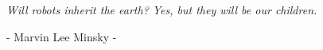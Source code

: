 \documentclass[twoside,b5paper,12pt,openright]{book}
\newcommand{\clearemptydoublepage}{\newpage {\pagestyle{empty} \cleardoublepage}}
\begin{document}
\pagestyle{plain}

% 




\tableofcontents       %

\clearemptydoublepage
\thispagestyle{empty}

\begin{flushright}
	\null{}

	\emph{Will robots inherit the earth? Yes, but they will be our children.}

	\emph{}

	- Marvin Lee Minsky -

	\null
\end{flushright}

\pagestyle{fancy} %



\renewcommand{\sectionmark}[1]{\markright{\thesection.\ #1}}
\renewcommand{\chaptermark}[1]{\markboth{\thechapter.\ #1}{}}

\fancyhf{}

\fancyhead[LE,RO]{\footnotesize \slshape \bfseries \thepage}
\fancyhead[LO]{\footnotesize \slshape \bfseries \rightmark}
\fancyhead[RE]{\footnotesize \slshape \bfseries \leftmark}

\renewcommand{\headrulewidth}{0.5pt}
\renewcommand{\footrulewidth}{0pt}
\addtolength{\headheight}{0.5pt}




\theoremstyle{plain}
\newtheorem{thm}{Theorem}[section]
\newtheorem{cor}[thm]{Corollary}
\newtheorem{lem}[thm]{Lemma}
\newtheorem{prop}[thm]{Proposition}
%
\theoremstyle{definition}
\newtheorem{defn}{Definition}[section]
%
\theoremstyle{remark}
\newtheorem{rem}{Remark}[section]
\end{document}
